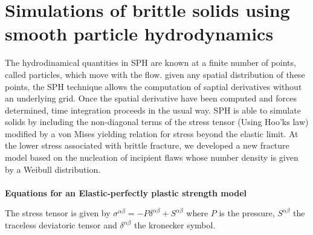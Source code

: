 \documentclass[12pt]{book}
\begin{document}
\chapter{Simulations of brittle solids using smooth particle hydrodynamics}
The hydrodinamical quantities in SPH are known at a finite number of points, called particles, which move with the flow. given any spatial distribution of these points, the SPH technique allows the computation of saptial derivatives without an underlying grid. Once the spatial derivative have been computed and forces determined, time integration proceeds in the usual way.\cite{benz95}
SPH is able to simulate solids by including the non-diagonal terms of the stress tensor (Using Hoo'ks law) modified by a von Mises yielding relation for stress beyond the elastic limit. At the lower stress associated with brittle fracture, we developed a new fracture model based on the nucleation of incipient flaws whose number density is given by a Weibull distribution.\\\\
\textbf{Equations for an Elastic-perfectly plastic strength model\\}

The stress tensor is given by $\sigma^{\alpha\beta}=-P\delta^{\alpha\beta}+S^{\alpha\beta}$ where $P$ is the pressure, $S^{\alpha\beta}$ the traceless deviatoric tensor and $\delta^{\alpha\beta}$ the kronecker symbol.


\end{document}
